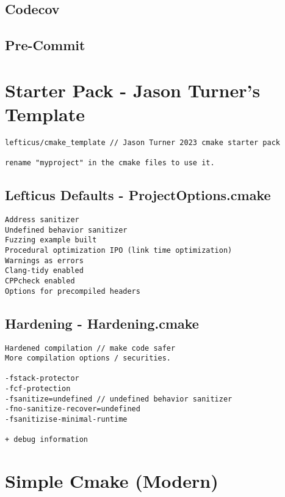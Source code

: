 \subsection{Codecov}


\subsection{Pre-Commit}



\section{Starter Pack - Jason Turner's Template}

\begin{verbatim}
lefticus/cmake_template // Jason Turner 2023 cmake starter pack

rename "myproject" in the cmake files to use it.

\end{verbatim}

\subsection{Lefticus Defaults - ProjectOptions.cmake}

\begin{verbatim}
Address sanitizer
Undefined behavior sanitizer
Fuzzing example built
Procedural optimization IPO (link time optimization)
Warnings as errors
Clang-tidy enabled
CPPcheck enabled
Options for precompiled headers
\end{verbatim}

\subsection{Hardening - Hardening.cmake}

\begin{verbatim}
Hardened compilation // make code safer
More compilation options / securities.

-fstack-protector
-fcf-protection
-fsanitize=undefined // undefined behavior sanitizer
-fno-sanitize-recover=undefined
-fsanitizise-minimal-runtime

+ debug information 
\end{verbatim}

\section{Simple Cmake (Modern)}

